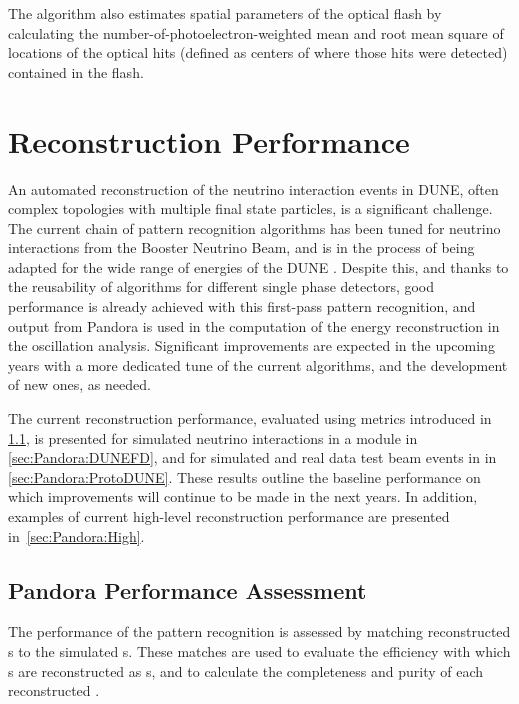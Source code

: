 The algorithm also estimates spatial parameters of the optical flash
by calculating the number-of-photoelectron-weighted mean and 
root mean square of locations of the optical hits
(defined as centers of  where those hits were detected)
contained in the flash.

\section{Reconstruction Performance}
\label{sec:performance}

An automated reconstruction of the neutrino interaction events in DUNE, often complex topologies with multiple final state particles, is a significant challenge. The current chain of  pattern recognition algorithms %
has been tuned for neutrino interactions from the \fnal Booster Neutrino Beam, and is in the process of being adapted for the wide range of energies of the DUNE . Despite this, and thanks to the reusability of  algorithms for different single phase \lartpc detectors,  good performance is already achieved with this first-pass pattern recognition, and output from Pandora is used in the computation of the energy reconstruction in the oscillation analysis. Significant improvements are expected  in the upcoming years with a more dedicated tune of the current algorithms, and the development of new ones, as needed. 

The current reconstruction performance, evaluated using metrics introduced in \ref{sec:Pandora:assessment}, is presented for simulated neutrino interactions in a \single \nominalmodsize {} module in \ref{sec:Pandora:DUNEFD}, and for simulated and real data test beam events in  in \ref{sec:Pandora:ProtoDUNE}. These results outline the baseline performance on which improvements will continue to be made in the next years. In addition, examples of current high-level reconstruction performance are presented in~\ref{sec:Pandora:High}.

\subsection{Pandora Performance Assessment}
\label{sec:Pandora:assessment}
The performance of the  pattern recognition is assessed by matching reconstructed s to the simulated s. These matches are used to evaluate the efficiency with which s are reconstructed as s, and to calculate the completeness and purity of each reconstructed . 




